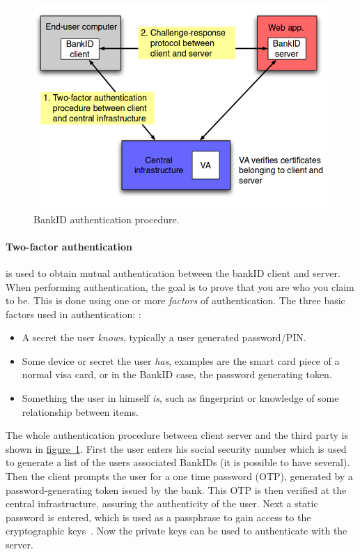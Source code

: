 \documentclass[a4paper,11pt]{article}
\begin{document}
\begin{figure}
  \centering
  \includegraphics[scale=0.35]{flow} %
  \vspace{-0.2cm}
  \caption{BankID authentication procedure.}
  \label{fig:flow}
\end{figure}
\paragraph{Two-factor authentication} is used to obtain mutual authentication between the bankID client and server. When performing authentication, the goal is to prove that you are who you claim to be. This is done using one or more \emph{factors} of authentication. The three basic factors used in authentication: \cite{auth-banking}:
\begin{itemize}
  \item A secret the user \emph{knows}, typically a user generated password/PIN. 
  \item Some device or secret the user \emph{has}, examples are the smart card piece of a normal visa card, or in the BankID case, the password generating token. 
  \item Something the user in himself \emph{is}, such as fingerprint or knowledge of some relationship between items.
\end{itemize}
The whole authentication procedure between client server and the third party is shown in \hyperref[fig:flow]{figure~\ref*{fig:flow}}. First the user enters his social security number which is used to generate a list of the users associated BankIDs (it is possible to have several). Then the client prompts the user for a one time password (OTP), generated by a password-generating token issued by the bank. This OTP is then verified at the central infrastructure, assuring the authenticity of the user. Next a static password is entered, which is used as a passphrase to gain access to the cryptographic keys~\cite{auth-banking}. Now the private keys can be used to authenticate with the server. 
\end{document}
